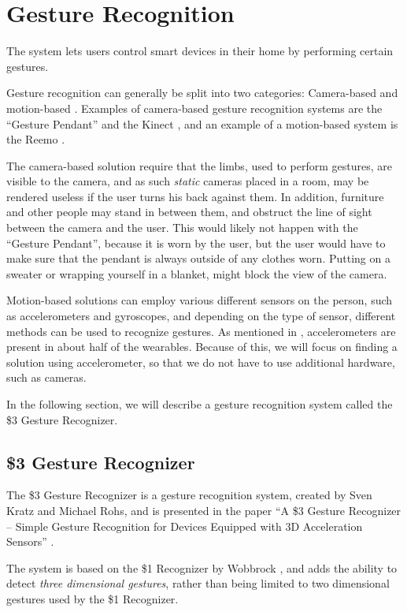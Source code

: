 \section{Gesture Recognition}\label{sec:gesturerecognition}
The system lets users control smart devices in their home by performing certain gestures.

Gesture recognition can generally be split into two categories: 
Camera-based and motion-based \cite{Kela2006}. 
Examples of camera-based gesture recognition systems are the ``Gesture Pendant'' \cite{starner2000gesture} and the Kinect \cite{kinect}, 
and an example of a motion-based system is the Reemo \cite{Reemo}.

The camera-based solution require that the limbs, 
used to perform gestures, 
are visible to the camera, 
and as such \emph{static} cameras placed in a room, 
may be rendered useless if the user turns his back against them. 
In addition, furniture and other people may stand in between them, 
and obstruct the line of sight between the camera and the user.
This would likely not happen with the ``Gesture Pendant'',
because it is worn by the user, 
but the user would have to make sure that the pendant is always outside of any clothes worn.
Putting on a sweater or wrapping yourself in a blanket, 
might block the view of the camera.

Motion-based solutions can employ various different sensors on the person,
such as accelerometers and gyroscopes, 
and depending on the type of sensor, 
different methods can be used to recognize gestures.
As mentioned in , accelerometers are present in about half of the wearables. 
Because of this, we will focus on finding a solution using accelerometer, 
so that we do not have to use additional hardware, such as cameras. 

In the following section, we will describe a gesture recognition system called the \$3 Gesture Recognizer. 

\subsection{\$3 Gesture Recognizer}\label{sec:threedollar}
The \$3 Gesture Recognizer is a gesture recognition system, 
created by Sven Kratz and Michael Rohs, 
and is presented in the paper ``A \$3 Gesture Recognizer – Simple Gesture Recognition for Devices Equipped with 3D Acceleration Sensors'' \cite{threedollar}.

The system is based on the \$1 Recognizer by Wobbrock \etal \cite{wobbrock2007gestures}, 
and adds the ability to detect \emph{three dimensional gestures}, 
rather than being limited to two dimensional gestures used by the \$1 Recognizer.

